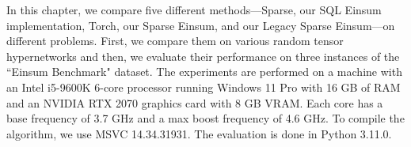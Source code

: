 
In this chapter, we compare five different methods—Sparse, our SQL Einsum implementation, Torch,
our Sparse Einsum, and our Legacy Sparse Einsum—on different problems. First, we compare them on
various random tensor hypernetworks and then, we evaluate their performance on three instances of
the ``Einsum Benchmark" \cite{einsum_benchmark} dataset. The experiments are performed on a machine
with an Intel i5-9600K 6-core processor running Windows 11 Pro with 16 GB of RAM and an NVIDIA
RTX 2070 graphics card with 8 GB VRAM. Each core has a base frequency of 3.7 GHz and a max boost
frequency of 4.6 GHz. To compile the algorithm, we use MSVC 14.34.31931. The evaluation is done
in Python 3.11.0.

